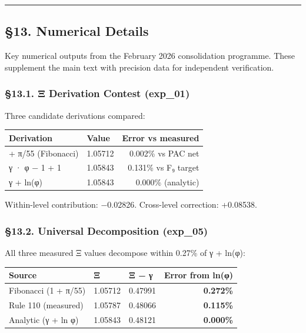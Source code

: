 \documentclass[
  11pt,
  a4paper]{article}
\begin{document}
\begin{center}\rule{0.5\linewidth}{0.5pt}\end{center}

\subsection{§13. Numerical Details}\label{numerical-details}

Key numerical outputs from the February 2026 consolidation programme.
These supplement the main text with precision data for independent
verification.

\subsubsection{§13.1. Ξ Derivation Contest
(exp\_01)}\label{ux3be-derivation-contest-exp_01}

Three candidate derivations compared:

\begin{longtable}[]{@{}llr@{}}
\toprule\noalign{}
Derivation & Value & Error vs measured \\
\midrule\noalign{}
\endhead
\bottomrule\noalign{}
\endlastfoot
1 + π/55 (Fibonacci) & 1.05712 & 0.002\% vs PAC net \\
γ · φ − 1 + 1 & 1.05843 & 0.131\% vs F₉ target \\
γ + ln(φ) & 1.05843 & 0.000\% (analytic) \\
\end{longtable}

Within-level contribution: −0.02826. Cross-level correction: +0.08538.

\subsubsection{§13.2. Universal Decomposition
(exp\_05)}\label{universal-decomposition-exp_05}

All three measured Ξ values decompose within 0.27\% of γ + ln(φ):

\begin{longtable}[]{@{}lllr@{}}
\toprule\noalign{}
Source & Ξ & Ξ − γ & Error from ln(φ) \\
\midrule\noalign{}
\endhead
\bottomrule\noalign{}
\endlastfoot
Fibonacci (1 + π/55) & 1.05712 & 0.47991 & \textbf{0.272\%} \\
Rule 110 (measured) & 1.05787 & 0.48066 & \textbf{0.115\%} \\
Analytic (γ + ln φ) & 1.05843 & 0.48121 & \textbf{0.000\%} \\
\end{longtable}
\end{document}

